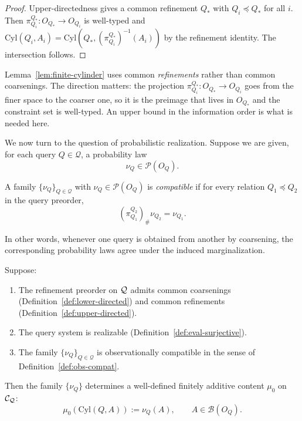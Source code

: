 \begin{proof}
Upper-directedness gives a common refinement $Q_*$ with $Q_i\preceq Q_*$
for all $i$.  Then $\pi^{Q_*}_{Q_i}:O_{Q_*}\to O_{Q_i}$ is well-typed
and $\mathrm{Cyl}(Q_i,A_i)=\mathrm{Cyl}(Q_*,(\pi^{Q_*}_{Q_i})^{-1}(A_i))$
by the refinement identity.  The intersection follows.
\end{proof}

\begin{remark}
Lemma~\ref{lem:finite-cylinder} uses common \emph{refinements} rather
than common coarsenings.  The direction matters: the projection
$\pi^{Q_*}_{Q_i}:O_{Q_*}\to O_{Q_i}$ goes from the finer space to the
coarser one, so it is the preimage that lives in $O_{Q_*}$ and the
constraint set is well-typed.  An upper bound in the information order
is what is needed here.
\end{remark}

We now turn to the question of probabilistic realization.
Suppose we are given, for each query $Q \in \mathcal Q$, a probability law
\[
\nu_Q \in \mathcal P(O_Q).
\]

\begin{definition}
\label{def:obs-compat}
A family $\{\nu_Q\}_{Q \in \mathcal Q}$ with $\nu_Q \in \mathcal P(O_Q)$
is \emph{compatible} if for every relation $Q_1 \preceq Q_2$ in the query preorder,
\[
(\pi^{Q_2}_{Q_1})_\# \nu_{Q_2}=\nu_{Q_1}.
\]
\end{definition}

In other words, whenever one query is obtained from another by
coarsening, the corresponding probability laws agree under the induced
marginalization.

\begin{theorem}
\label{thm:finite-content}
Suppose:
\begin{enumerate}
\item The refinement preorder on $\mathcal{Q}$ admits common coarsenings
(Definition~\ref{def:lower-directed}) and common refinements
(Definition~\ref{def:upper-directed}).
\item The query system is realizable (Definition~\ref{def:eval-surjective}).
\item The family $\{\nu_Q\}_{Q \in \mathcal Q}$ is observationally compatible
in the sense of Definition~\ref{def:obs-compat}.
\end{enumerate}
Then the family $\{\nu_Q\}$ determines a well-defined finitely
additive content $\mu_0$ on $\mathcal{C}_{\mathcal{Q}}$:
\[
\mu_0(\mathrm{Cyl}(Q,A)) := \nu_Q(A), \qquad A\in\mathcal B(O_Q).
\]
\end{theorem}

